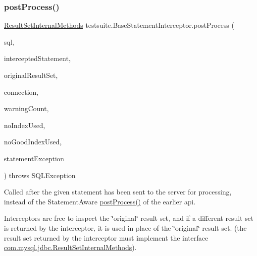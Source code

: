 \mbox{\label{classtestsuite_1_1_base_statement_interceptor_a00ff902755e287c1a983e8d840ca32d5}} 
\subsubsection{\texorpdfstring{post\+Process()}{postProcess()}}
{\footnotesize\ttfamily \mbox{\hyperlink{interfacecom_1_1mysql_1_1jdbc_1_1_result_set_internal_methods}{Result\+Set\+Internal\+Methods}} testsuite.\+Base\+Statement\+Interceptor.\+post\+Process (\begin{DoxyParamCaption}\item[{String}]{sql,  }\item[{\mbox{\hyperlink{interfacecom_1_1mysql_1_1jdbc_1_1_statement}{Statement}}}]{intercepted\+Statement,  }\item[{\mbox{\hyperlink{interfacecom_1_1mysql_1_1jdbc_1_1_result_set_internal_methods}{Result\+Set\+Internal\+Methods}}}]{original\+Result\+Set,  }\item[{\mbox{\hyperlink{interfacecom_1_1mysql_1_1jdbc_1_1_connection}{Connection}}}]{connection,  }\item[{int}]{warning\+Count,  }\item[{boolean}]{no\+Index\+Used,  }\item[{boolean}]{no\+Good\+Index\+Used,  }\item[{S\+Q\+L\+Exception}]{statement\+Exception }\end{DoxyParamCaption}) throws S\+Q\+L\+Exception}

Called after the given statement has been sent to the server for processing, instead of the Statement\+Aware \mbox{\hyperlink{classtestsuite_1_1_base_statement_interceptor_a00ff902755e287c1a983e8d840ca32d5}{post\+Process()}} of the earlier api.

Interceptors are free to inspect the \char`\"{}original\char`\"{} result set, and if a different result set is returned by the interceptor, it is used in place of the \char`\"{}original\char`\"{} result set. (the result set returned by the interceptor must implement the interface \mbox{\hyperlink{interfacecom_1_1mysql_1_1jdbc_1_1_result_set_internal_methods}{com.\+mysql.\+jdbc.\+Result\+Set\+Internal\+Methods}}).

